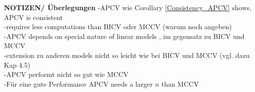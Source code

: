\documentclass[Research_Module_ES.tex]{subfiles}
\begin{document}
\textbf{NOTIZEN/ Überlegungen}
-APCV wie Corollary \ref{Consistency_APCV} shows, APCV is consistent\\
-requires less computations than BICV oder MCCV (warum noch angeben)\\
-APCV depends on special nature of linear models , im gegensatz zu BICV und MCCV\\
-extension zu anderen models nicht so leicht wie bei BICV und MCCV (vgl. dazu Kap 4.5)\\
-APCV performt nicht so gut wie MCCV\\
-Für eine gute Performance APCV needs a larger $n$ than MCCV
\end{document}
